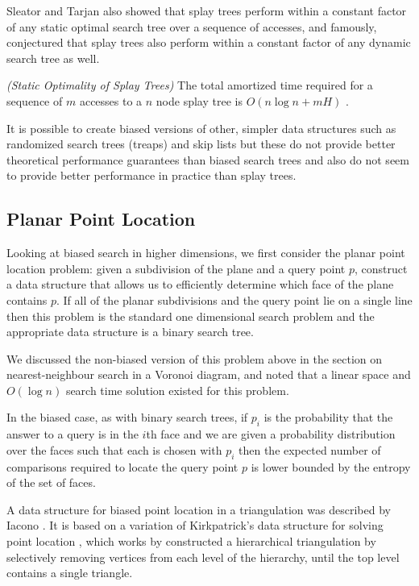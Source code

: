 \documentclass[mcs]{scsthesis}
\begin{document}
Sleator and Tarjan also showed that splay trees perform within a constant
factor of any static optimal search tree over a sequence of accesses, and
famously, conjectured that splay trees also perform within a constant factor
of any dynamic search tree as well.

\begin{thm} \emph{(Static Optimality of Splay Trees)} 
The total amortized time required for a sequence of $m$ accesses to a $n$
node splay tree is \(O(n \log n + mH)\) \cite{splaytree}.
\end{thm}

It is possible to create biased versions of other, simpler data structures
such as randomized search trees (treaps) \cite{treap} and skip lists
\cite{bsl2} but these do not provide better theoretical performance guarantees
than biased search trees and also do not seem to provide better performance in
practice than splay trees.

\subsection{Planar Point Location}

Looking at biased search in higher dimensions, we first consider the planar
point location problem: given a subdivision of the plane and a query point \(p\),
construct a data structure that allows us to efficiently determine which face
of the plane contains \(p\). If all of the planar subdivisions and the query
point lie on a single line then this problem is the standard one dimensional
search problem and the appropriate data structure is a binary search tree.

We discussed the non-biased version of this problem above in the section on
nearest-neighbour search in a Voronoi diagram, and noted that a linear space
and \(O(\log n)\) search time solution existed for this problem.

In the biased case, as with binary search trees, if \(p_i\) is the probability
that the answer to a query is in the \(i\)th face and we are given a probability
distribution over the faces such that each is chosen with \(p_i\) then the
expected number of comparisons required to locate the query point \(p\) is
lower bounded by the entropy of the set of faces.

A data structure for biased point location in a triangulation was described
by Iacono \cite{iacono}. It is based on a variation of Kirkpatrick's data
structure for solving point location \cite{kirkpatrick}, which works by
constructed a hierarchical triangulation by selectively removing vertices
from each level of the hierarchy, until the top level contains a single triangle.
\end{document}
